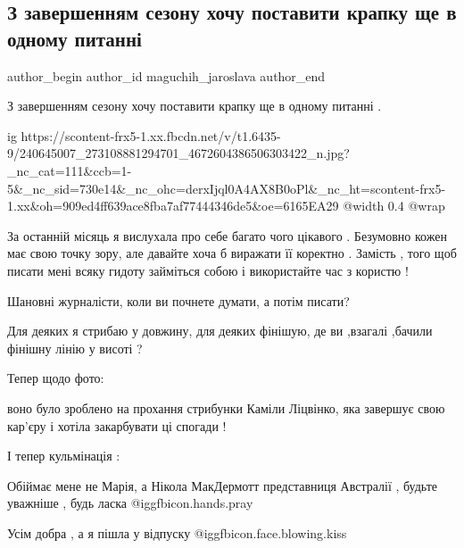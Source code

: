  
 
 
 
 
 
\subsection{З завершенням сезону хочу  поставити крапку ще в одному питанні}
\label{sec:10_09_2021.fb.maguchih_jaroslava.1.foto_lasickene_new}
 
\ifcmt
 author_begin
   author_id maguchih_jaroslava
 author_end
\fi

З завершенням сезону хочу  поставити крапку  ще в одному питанні .

\ifcmt
  ig https://scontent-frx5-1.xx.fbcdn.net/v/t1.6435-9/240645007_273108881294701_4672604386506303422_n.jpg?_nc_cat=111&ccb=1-5&_nc_sid=730e14&_nc_ohc=derxIjql0A4AX8B0oPl&_nc_ht=scontent-frx5-1.xx&oh=909ed4ff639ace8fba7af77444346de5&oe=6165EA29
  @width 0.4
  @wrap 
\fi

За останній  місяць я вислухала про себе багато чого цікавого . Безумовно кожен
має свою точку зору, але давайте хоча б виражати її коректно . Замість , того
щоб писати мені всяку гидоту займіться собою і використайте час з користю !

Шановні журналісти, коли ви почнете думати, а потім писати?

Для деяких я стрибаю у довжину, для деяких фінішую, де ви ,взагалі ,бачили
фінішну лінію у висоті ?

Тепер щодо фото: 

воно було зроблено на прохання  стрибунки Каміли Ліцвінко, яка завершує свою
кар’єру  і хотіла закарбувати ці спогади !

І тепер кульмінація :

Обіймає мене не Марія, а Нікола МакДермотт представниця Австралії , будьте
уважніше , будь ласка @igg{fbicon.hands.pray} 

Усім добра , а я пішла у відпуску  @igg{fbicon.face.blowing.kiss} 
